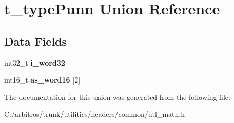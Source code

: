 \hypertarget{uniont__type_punn}{\section{t\-\_\-type\-Punn Union Reference}
\label{uniont__type_punn}
}
\subsection*{Data Fields}
\begin{DoxyCompactItemize}
\item 
\hypertarget{uniont__type_punn_a2e7ade0523ff910f41945a123821bab5}{int32\-\_\-t {\bfseries i\-\_\-word32}}\label{uniont__type_punn_a2e7ade0523ff910f41945a123821bab5}

\item 
\hypertarget{uniont__type_punn_a3a0a67aa24c0b58a03417874be4b61de}{int16\-\_\-t {\bfseries as\-\_\-word16} \mbox{[}2\mbox{]}}\label{uniont__type_punn_a3a0a67aa24c0b58a03417874be4b61de}

\end{DoxyCompactItemize}


The documentation for this union was generated from the following file\-:\begin{DoxyCompactItemize}
\item 
C\-:/arbitros/trunk/utilities/headers/common/utl\-\_\-math.\-h\end{DoxyCompactItemize}
